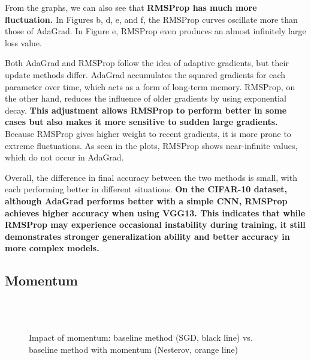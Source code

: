 \documentclass[12pt]{article}
\begin{document}
From the graphs, we can also see that \textbf{RMSProp has much more fluctuation.} In Figures b, d, e, and f, the RMSProp curves oscillate more than those of AdaGrad. In Figure e, RMSProp even produces an almost infinitely large loss value. 

Both AdaGrad and RMSProp follow the idea of adaptive gradients, but their update methods differ. AdaGrad accumulates the squared gradients for each parameter over time, which acts as a form of long-term memory. RMSProp, on the other hand, reduces the influence of older gradients by using exponential decay. \textbf{This adjustment allows RMSProp to perform better in some cases but also makes it more sensitive to sudden large gradients.} Because RMSProp gives higher weight to recent gradients, it is more prone to extreme fluctuations. As seen in the plots, RMSProp shows near-infinite values, which do not occur in AdaGrad.

Overall, the difference in final accuracy between the two methods is small, with each performing better in different situations. \textbf{On the CIFAR-10 dataset, although AdaGrad performs better with a simple CNN, RMSProp achieves higher accuracy when using VGG13. This indicates that while RMSProp may experience occasional instability during training, it still demonstrates stronger generalization ability and better accuracy in more complex models.}


\subsection{Momentum}


\begin{figure}[htbp]
    \centering
     \quad
     \\
     \quad
     \\
     \quad
    \caption{Impact of momentum: baseline method (SGD, black line) vs. baseline method with momentum (Nesterov, orange line)}
    \label{fig:momentum_study}
\end{figure}
\end{document}
